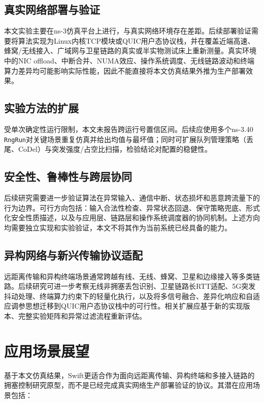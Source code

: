 \subsection{真实网络部署与验证}

本文实验主要在ns-3仿真平台上进行，与真实网络环境存在差距。后续部署验证需要将算法实现为Linux内核TCP模块或QUIC用户态协议栈，并在覆盖近端高速、蜂窝/无线接入、广域网与卫星链路的真实或半实物测试床上重新测量。真实环境中的NIC offload、中断合并、NUMA效应、操作系统调度、无线链路波动和终端算力差异均可能影响实际性能，因此不能直接将本文仿真结果外推为生产部署效果。

\subsection{实验方法的扩展}

受单次确定性运行限制，本文未报告跨运行号置信区间。后续应使用多个ns-3.40 \texttt{RngRun}对关键场景重复仿真并给出均值与最坏值；同时可扩展队列管理策略（丢尾、CoDel）与突发强度/占空比扫描，检验结论对配置的稳健性。

\subsection{安全性、鲁棒性与跨层协同}

后续研究需要进一步验证算法在异常输入、通信中断、状态损坏和恶意跨流量下的行为边界。可行方向包括：输入合法性检查、异常状态回退、保守策略兜底、形式化安全性质描述，以及与应用层、链路层和操作系统调度器的协同机制。上述方向均需要独立实现和实验验证，本文不将其作为当前系统已经具备的能力。

\subsection{异构网络与新兴传输协议适配}

远距离传输和异构终端场景通常跨越有线、无线、蜂窝、卫星和边缘接入等多类链路。后续研究可进一步考察无线非拥塞丢包识别、卫星链路长RTT适配、5G突发抖动处理、终端算力约束下的轻量化执行，以及将多信号融合、差异化响应和自适应调参思想迁移到QUIC用户态协议栈中的可行性。相关扩展应基于新的实现版本、完整实验矩阵和异常过滤流程重新评估。

\section{应用场景展望}\label{Sec6.3}

基于本文仿真结果，Swift更适合作为面向远距离传输、异构终端和多接入链路的拥塞控制研究原型，而不是已经完成真实网络生产部署验证的协议。其潜在应用场景包括：

